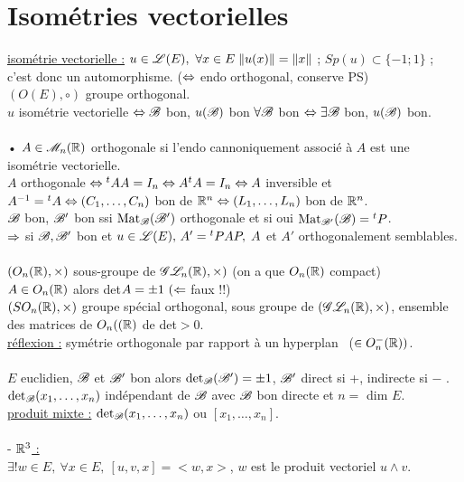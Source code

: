 \documentclass[12 pt]{book}
\begin{document}
\section*{Isométries vectorielles}
\underline{isométrie vectorielle :} $u\in\mathscr{L}(E), \ \forall x\in E \; \|u(x)\|= \|x\|$ ; $Sp(u)\subset\{-1;1\}$ ; c'est donc un automorphisme. \qquad ($\Leftrightarrow$ endo orthogonal, conserve PS)\\
$(O(E),\circ)$ groupe orthogonal.\\
$u$ isométrie vectorielle $\Leftrightarrow \mathscr{B}$ bon, $u(\mathscr{B})$ bon $\forall \mathscr{B}$ bon $\Leftrightarrow \exists \mathscr{B}$ bon, $u(\mathscr{B})$ bon.\\
\text{}\\
• $A\in \mathscr{M}_n(\mathbb{R})$ orthogonale si l'endo cannoniquement associé à $A$ est une isométrie vectorielle.\\
$A$ orthogonale $\Leftrightarrow {}^tAA=I_n \Leftrightarrow A{}^tA=I_n \Leftrightarrow A$ inversible et $A^{-1} ={}^tA \Leftrightarrow (C_1,\dots,C_n)$ bon de $\mathbb{R}^n \Leftrightarrow (L_1,\dots,L_n)$ bon de $\mathbb{R}^n$.\\
$\mathscr{B}$ bon, $\mathscr{B}'$ bon ssi $\text{Mat}_{\mathscr{B}}(\mathscr{B}')$ orthogonale et si oui $\text{Mat}_{\mathscr{B}'}(\mathscr{B}) = {}^tP$.\\
$\Rightarrow$ si $\mathscr{B}, \mathscr{B}'$ bon et $u\in\mathscr{L}(E), \, A'={}^tPAP, \; A$ et $A'$ orthogonalement semblables.\\
\text{}\\
$(O_n(\mathbb{R}),\times)$ sous-groupe de $\mathscr{G}\mathscr{L}_n(\mathbb{R}),\times)$ \qquad (on a que $O_n(\mathbb{R})$ compact)\\
$A\in O_n(\mathbb{R})$ alors det$A = \pm 1 \ (\Leftarrow$ faux !!)\\
$(SO_n(\mathbb{R}), \times)$ groupe spécial orthogonal, sous groupe de $(\mathscr{G}\mathscr{L}_n(\mathbb{R}),\times)$, ensemble des matrices de $O_n((\mathbb{R})$ de det$>0$.\\
\underline{réflexion :} symétrie orthogonale par rapport à un hyperplan \ ($\in O_n^-(\mathbb{R}))$.\\
\text{}\\
$E$ euclidien, $\mathscr{B}$ et $\mathscr{B}'$ bon alors $\text{det}_{\mathscr{B}}(\mathscr{B}') = \pm 1$, $\mathscr{B}'$ direct si +, indirecte si $-$ .\\
$\text{det}_{\mathscr{B}} (x_1,\dots,x_n)$ indépendant de $\mathscr{B}$ avec $\mathscr{B}$ bon directe et $n=$ dim $E$.\\
\underline{produit mixte :} $\text{det}_{\mathscr{B}}(x_1,\dots,x_n)$ ou $[x_1,\dots,x_n]$.\\
\text{}\\
- \underline{$\mathbb{R}^3$ :}\\
$\exists! w\in E, \ \forall x\in E, \ [u,v,x]=<w,x>$, $w$ est le produit vectoriel $u\land v$.\\
\end{document}

